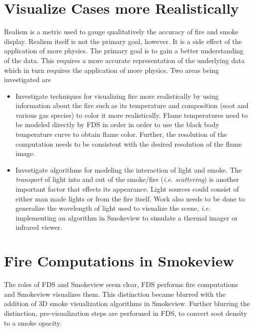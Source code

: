 \documentclass[11pt,twoside]{book}
\begin{document}
%
%

\section{Visualize Cases more Realistically}
Realism is a metric used to gauge qualitatively the accuracy of
fire and smoke display. Realism itself is not the primary goal,
however.  It is a side effect of the application of more physics.
The primary goal is to gain a better understanding of the data.
This requires a more accurate representation of the underlying
data which in turn requires the application of more physics.  Two
areas being investigated are
\begin{itemize}
\item Investigate techniques for visualizing fire more
realistically by using information about the fire such as its
temperature and composition (soot and various gas species) to
color it more realistically.  Flame temperatures need to be
modeled directly by FDS in order in order to use the black body
temperature curve to obtain flame color.  Further, the resolution
of the computation needs to be consistent with the desired
resolution of the flame image.

\item Investigate algorithms for modeling the interaction of light
and smoke. The {\em transport} of light into and out of the
smoke/fire ({\em i.e. scattering}) is another important factor
that effects its appearance.  Light sources could consist of
either man made lights or from the fire itself.  Work also needs
to be done to generalize the wavelength of light used to visualize
the scene, {\em i.e.} implementing an algorithm in Smokeview to
simulate a thermal imager or infrared viewer.
\end{itemize}

%
%

\section{Fire Computations in Smokeview}
The roles of FDS and Smokeview seem clear, FDS performs fire
computations and Smokeview visualizes them. This distinction
became blurred with the addition of 3D smoke visualization
algorithms in Smokeview. Further blurring the distinction,
pre-visualization steps are performed in FDS, to convert soot
density to a smoke opacity.
\end{document}
